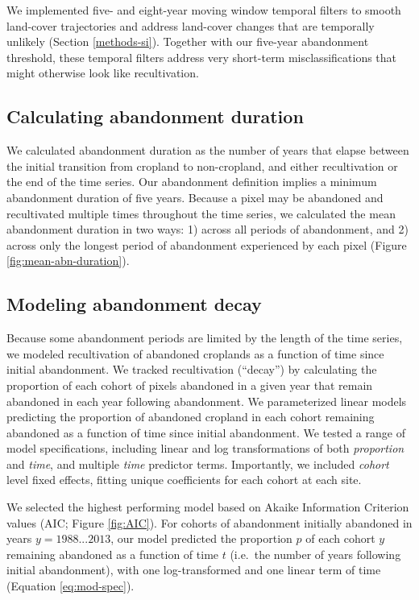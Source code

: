 \documentclass[9pt,twocolumn,twoside,lineno]{pnas-new}
\begin{document}
We implemented five- and eight-year moving window temporal filters to smooth land-cover trajectories and address land-cover changes that are temporally unlikely (Section \ref{methods-si}).
Together with our five-year abandonment threshold, these temporal filters address very short-term misclassifications that might otherwise look like recultivation.

\hypertarget{calculating-abandonment-duration}{%
\subsection{Calculating abandonment duration}\label{calculating-abandonment-duration}}

We calculated abandonment duration as the number of years that elapse between the initial transition from cropland to non-cropland, and either recultivation or the end of the time series.
Our abandonment definition implies a minimum abandonment duration of five years.
Because a pixel may be abandoned and recultivated multiple times throughout the time series, we calculated the mean abandonment duration in two ways: 1) across all periods of abandonment, and 2) across only the longest period of abandonment experienced by each pixel (Figure \ref{fig:mean-abn-duration}).

\hypertarget{modeling-abandonment-decay}{%
\subsection{Modeling abandonment decay}\label{modeling-abandonment-decay}}

Because some abandonment periods are limited by the length of the time series, we modeled recultivation of abandoned croplands as a function of time since initial abandonment.
We tracked recultivation (``decay'') by calculating the proportion of each cohort of pixels abandoned in a given year that remain abandoned in each year following abandonment.
We parameterized linear models predicting the proportion of abandoned cropland in each cohort remaining abandoned as a function of time since initial abandonment.
We tested a range of model specifications, including linear and log transformations of both \emph{proportion} and \emph{time}, and multiple \emph{time} predictor terms.
Importantly, we included \emph{cohort} level fixed effects, fitting unique coefficients for each cohort at each site.

We selected the highest performing model based on Akaike Information Criterion values (AIC; Figure \ref{fig:AIC}).
For cohorts of abandonment initially abandoned in years \(y = 1988 ... 2013\), our model predicted the proportion \(p\) of each cohort \(y\) remaining abandoned as a function of time \(t\) (i.e.~the number of years following initial abandonment), with one log-transformed and one linear term of time (Equation \eqref{eq:mod-spec}).
\end{document}
